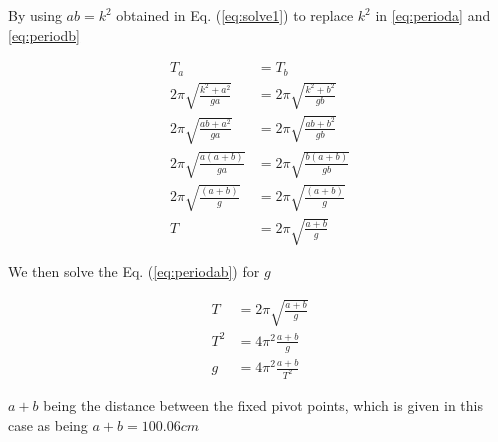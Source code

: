 \documentclass{report}
\begin{document}
By using $ab=k^2$ obtained in Eq. (\ref{eq:solve1}) to replace $k^2$ in \ref{eq:perioda} and \ref{eq:periodb} 

\begin{equation}
    \begin{aligned}
        T_a&=T_b \\
        2\pi \sqrt{\frac{k^2+a^2}{ga}} &=2\pi \sqrt{\frac{k^2+b^2}{gb}} \\
        2\pi \sqrt{\frac{ab+a^2}{ga}} &=2\pi \sqrt{\frac{ab+b^2}{gb}} \\
        2\pi \sqrt{\frac{a\left(a+b\right)}{ga}} &=2\pi \sqrt{\frac{b\left(a+b\right)}{gb}} \\
        2\pi \sqrt{\frac{\left(a+b\right)}{g}} &=2\pi \sqrt{\frac{\left(a+b\right)}{g}} \\
        T&=2\pi \sqrt{\frac{a+b}{ g }} \label{eq:periodab}
    \end{aligned}
\end{equation}


We then solve the Eq. (\ref{eq:periodab}) for $g$

\begin{equation}
    \begin{aligned}
        T&=2\pi \sqrt{\frac{a+b}{ g }} \\
        T^2&=4\pi^2 \frac{a+b}{ g } \\
        g&=4\pi^2\frac{ a+b }{ T^2 }
    \end{aligned}
\end{equation}

$a+b$ being the distance between the fixed pivot points, which is given in this case as being $a+b=100.06cm$
\end{document}
